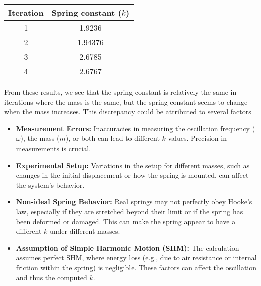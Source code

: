 \documentclass{report}
\begin{document}
        \bigbreak \noindent 
        \begin{center}
            \begin{tabular}{c|c}
                Iteration & Spring constant ($k$) \\
                \hline
                1 & 1.9236\\ 
                2 & 1.94376\\
                3 & 2.6785\\
                4  & 2.6767
            \end{tabular}
        \end{center}
        \bigbreak \noindent 
        From these results, we see that the spring constant is relatively the same in iterations where the mass is the same, but the spring constant seems to change when the mass increases. This discrepancy could be attributed to several factors
        \begin{itemize}
            \item \textbf{Measurement Errors:} Inaccuracies in measuring the oscillation frequency ($\omega$), the mass ($m$), or both can lead to different $k$ values. Precision in measurements is crucial.
            \item \textbf{Experimental Setup:} Variations in the setup for different masses, such as changes in the initial displacement or how the spring is mounted, can affect the system's behavior.
            \item \textbf{Non-ideal Spring Behavior:} Real springs may not perfectly obey Hooke's law, especially if they are stretched beyond their limit or if the spring has been deformed or damaged. This can make the spring appear to have a different $k$ under different masses.
            \item \textbf{Assumption of Simple Harmonic Motion (SHM):} The calculation assumes perfect SHM, where energy loss (e.g., due to air resistance or internal friction within the spring) is negligible. These factors can affect the oscillation and thus the computed $k$.
        \end{itemize}


    \bigbreak \noindent 
\end{document}
